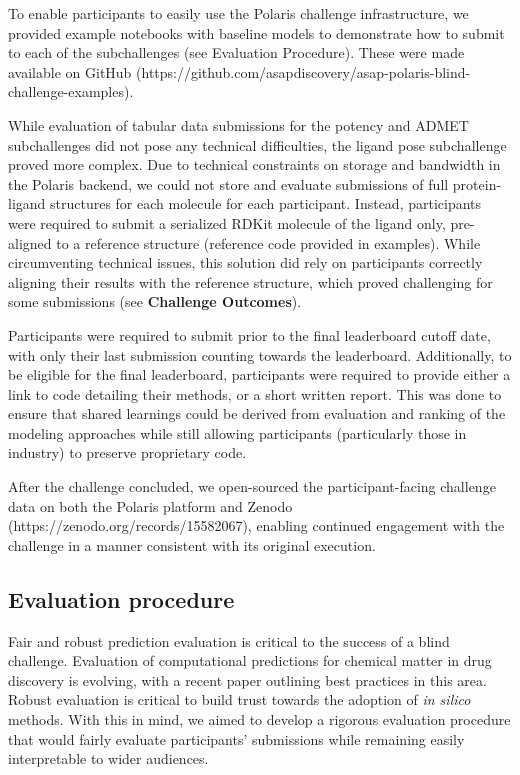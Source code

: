 \documentclass[journal=jcim,manuscript=article]{achemso}
\begin{document}
To enable participants to easily use the Polaris challenge infrastructure, we provided example notebooks with baseline models to demonstrate how to submit to each of the subchallenges (see Evaluation Procedure). These were made available on GitHub (https://github.com/asapdiscovery/asap-polaris-blind-challenge-examples). 

While evaluation of tabular data submissions for the potency and ADMET subchallenges did not pose any technical difficulties, the ligand pose subchallenge proved more complex. Due to technical constraints on storage and bandwidth in the Polaris backend, we could not store and evaluate submissions of full protein-ligand structures for each molecule for each participant. Instead, participants were required to submit a serialized RDKit molecule of the ligand only, pre-aligned to a reference structure (reference code provided in examples). While circumventing technical issues, this solution did rely on participants correctly aligning their results with the reference structure, which proved challenging for some submissions (see \textbf{Challenge Outcomes}).

Participants were required to submit prior to the final leaderboard cutoff date, with only their last submission counting towards the leaderboard. Additionally, to be eligible for the final leaderboard, participants were required to provide either a link to code detailing their methods, or a short written report. This was done to ensure that shared learnings could be derived from evaluation and ranking of the modeling approaches while still allowing participants (particularly those in industry) to preserve proprietary code. 

After the challenge concluded, we open-sourced the participant-facing challenge data on both the Polaris platform and Zenodo (https://zenodo.org/records/15582067), enabling continued engagement with the challenge in a manner consistent with its original execution.


\subsection{Evaluation procedure}    

Fair and robust prediction evaluation is critical to the success of a blind challenge\cite{sampl6_2018}. Evaluation of computational predictions for chemical matter in drug discovery is evolving, with a recent paper outlining best practices in this area\cite{ash_practically_2024}. Robust evaluation is critical to build trust towards the adoption of \textit{in silico} methods. With this in mind, we aimed to develop a rigorous evaluation procedure that would fairly evaluate participants' submissions while remaining easily interpretable to wider audiences.
\end{document}
